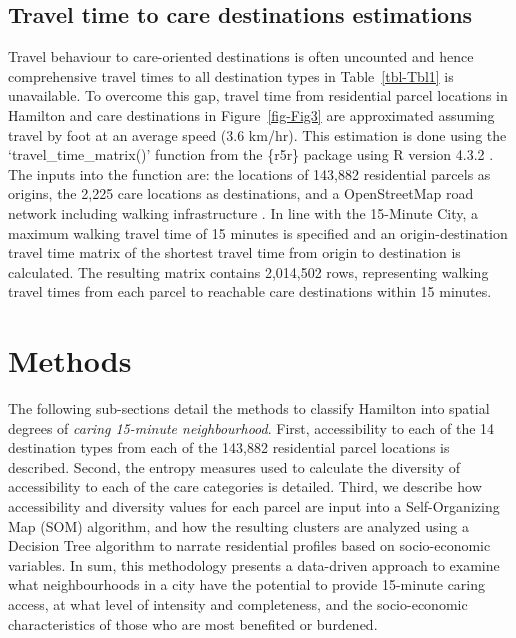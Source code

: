 \documentclass[
  authoryear,
  preprint,
  3p]{elsarticle}
\begin{document}
\newpage

\subsection{Travel time to care destinations
estimations}\label{travel-time-to-care-destinations-estimations}

Travel behaviour to care-oriented destinations is often uncounted and
hence comprehensive travel times to all destination types in
Table~\ref{tbl-Tbl1} is unavailable. To overcome this gap, travel time
from residential parcel locations in Hamilton and care destinations in
Figure~\ref{fig-Fig3} are approximated assuming travel by foot at an
average speed (3.6 km/hr). This estimation is done using the
`travel\_time\_matrix()' function from the \{r5r\} package
\citep{pereiraR5rRapidRealistic2021} using R version 4.3.2
\citep{coreR2023}. The inputs into the function are: the locations of
143,882 residential parcels as origins, the 2,225 care locations as
destinations, and a OpenStreetMap road network including walking
infrastructure \citep{geofabrikOntarioCanadaOpen2023}. In line with the
15-Minute City, a maximum walking travel time of 15 minutes is specified
and an origin-destination travel time matrix of the shortest travel time
from origin to destination is calculated. The resulting matrix contains
2,014,502 rows, representing walking travel times from each parcel to
reachable care destinations within 15 minutes.

\section{Methods}\label{methods}

The following sub-sections detail the methods to classify Hamilton into
spatial degrees of \emph{caring 15-minute neighbourhood}. First,
accessibility to each of the 14 destination types from each of the
143,882 residential parcel locations is described. Second, the entropy
measures used to calculate the diversity of accessibility to each of the
care categories is detailed. Third, we describe how accessibility and
diversity values for each parcel are input into a Self-Organizing Map
(SOM) algorithm, and how the resulting clusters are analyzed using a
Decision Tree algorithm to narrate residential profiles based on
socio-economic variables. In sum, this methodology presents a
data-driven approach to examine what neighbourhoods in a city have the
potential to provide 15-minute caring access, at what level of intensity
and completeness, and the socio-economic characteristics of those who
are most benefited or burdened.
\end{document}
